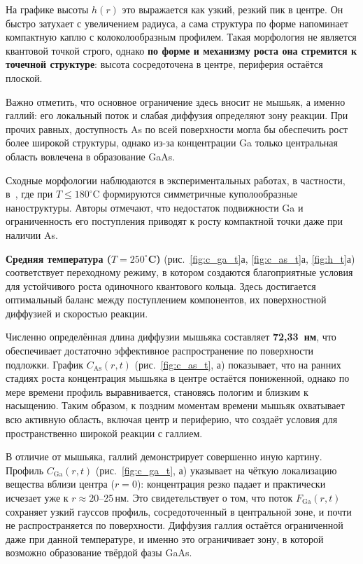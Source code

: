 \documentclass[14pt,oneside]{extarticle}
\begin{document}
На графике высоты $h(r)$ это выражается как узкий, резкий пик в центре. Он быстро затухает с увеличением радиуса, а сама структура по форме напоминает компактную каплю с колоколообразным профилем. Такая морфология не является квантовой точкой строго, однако \textbf{по форме и механизму роста она стремится к точечной структуре}: высота сосредоточена в центре, периферия остаётся плоской.

Важно отметить, что основное ограничение здесь вносит не мышьяк, а именно галлий: его локальный поток и слабая диффузия определяют зону реакции. При прочих равных, доступность As по всей поверхности могла бы обеспечить рост более широкой структуры, однако из-за концентрации Ga только центральная область вовлечена в образование GaAs.

Сходные морфологии наблюдаются в экспериментальных работах, в частности, в~\cite{gurioli2021}, где при $T \leq 180^\circ$C формируются симметричные куполообразные наноструктуры. Авторы отмечают, что недостаток подвижности Ga и ограниченность его поступления приводят к росту компактной точки даже при наличии As.

\textbf{Средняя температура ($T = 250^\circ$C)} (рис.~\ref{fig:c_ga_t}а, \ref{fig:c_as_t}а, \ref{fig:h_t}а) соответствует переходному режиму, в котором создаются благоприятные условия для устойчивого роста одиночного квантового кольца. Здесь достигается оптимальный баланс между поступлением компонентов, их поверхностной диффузией и скоростью реакции.

Численно определённая длина диффузии мышьяка составляет \textbf{72{,}33~нм}, что обеспечивает достаточно эффективное распространение по поверхности подложки. График $C_{\text{As}}(r, t)$ (рис.~\ref{fig:c_as_t}, а) показывает, что на ранних стадиях роста концентрация мышьяка в центре остаётся пониженной, однако по мере времени профиль выравнивается, становясь пологим и близким к насыщению. Таким образом, к поздним моментам времени мышьяк охватывает всю активную область, включая центр и периферию, что создаёт условия для пространственно широкой реакции с галлием.

В отличие от мышьяка, галлий демонстрирует совершенно иную картину. Профиль $C_{\text{Ga}}(r, t)$ (рис.~\ref{fig:c_ga_t}, а) указывает на чёткую локализацию вещества вблизи центра ($r = 0$): концентрация резко падает и практически исчезает уже к $r \approx 20$–25\,нм. Это свидетельствует о том, что поток $F_{\text{Ga}}(r, t)$ сохраняет узкий гауссов профиль, сосредоточенный в центральной зоне, и почти не распространяется по поверхности. Диффузия галлия остаётся ограниченной даже при данной температуре, и именно это ограничивает зону, в которой возможно образование твёрдой фазы GaAs.
\end{document}
